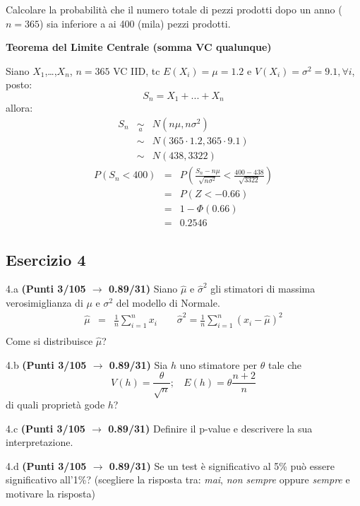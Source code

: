 \documentclass[
  11pt,
]{book}
\theoremstyle{mytheoremstyle}
\theoremstyle{mydefstyle}
\newenvironment{sol}
  {
  \begin{tcolorbox}[enhanced,breakable,arc=0.1mm,boxrule=1pt,colback=white,colframe=iblue,
  title=\bf \fontfamily{lmss}\selectfont \hspace{.5 cm} Soluzione,drop fuzzy shadow]

}{
\end{tcolorbox}
  }
\begin{document}
Calcolare la probabilità che il numero totale di pezzi prodotti dopo un anno (\(n=365\)) sia inferiore a ai 400 (mila) pezzi prodotti.

\begin{sol}
\textbf{Teorema del Limite Centrale (somma VC qualunque)}

Siano \(X_1\),\ldots,\(X_n\), \(n=365\) VC IID, tc \(E(X_i)=\mu=1.2\) e \(V(X_i)=\sigma^2=9.1,\forall i\), posto:
\[
      S_n = X_1 + ... + X_n
      \]
allora:\begin{eqnarray*}
  S_n & \mathop{\sim}\limits_{a}& N(n\mu,n\sigma^2) \\
     &\sim & N(365\cdot1.2,365\cdot9.1) \\
     &\sim & N(438,3322) 
  \end{eqnarray*}\begin{eqnarray*}
      P( S_n   <   400 ) 
        &=& P\left(  \frac { S_n  -  n\mu }{ \sqrt{n\sigma^2} }  <  \frac { 400  -  438 }{\sqrt{ 3322 }} \right)  \\
                 &=& P\left(  Z   <   -0.66 \right) \\    
                 &=&  1-\Phi( 0.66 ) \\ &=&  0.2546 
      \end{eqnarray*}

\end{sol}

\subsection{Esercizio 4}\label{esercizio-4-28}

4.a \textbf{(Punti 3/105 \(\rightarrow\) 0.89/31)} Siano \(\hat \mu\) e \(\hat\sigma^2\) gli stimatori di massima verosimiglianza di \(\mu\) e \(\sigma^2\) del modello di Normale.
\begin{eqnarray*}
  \hat\mu &=&  \frac 1n\sum_{i=1}^nx_i \qquad \hat\sigma^2 =  \frac 1n\sum_{i=1}^n(x_i-\hat\mu)^2\\
\end{eqnarray*}
Come si distribuisce \(\hat\mu\)?

4.b \textbf{(Punti 3/105 \(\rightarrow\) 0.89/31)} Sia \(h\) uno stimatore per \(\theta\) tale che
\[V(h)=\frac\theta {\sqrt{n}};~~~~E(h)=\theta\frac{n+2}{n}\]
di quali proprietà gode \(h\)?

4.c \textbf{(Punti 3/105 \(\rightarrow\) 0.89/31)} Definire il p-value e descrivere la sua interpretazione.

4.d \textbf{(Punti 3/105 \(\rightarrow\) 0.89/31)} Se un test è significativo al 5\% può essere significativo all'1\%? (scegliere la risposta tra: \emph{mai}, \emph{non sempre} oppure \emph{sempre} e motivare la risposta)
\end{document}
